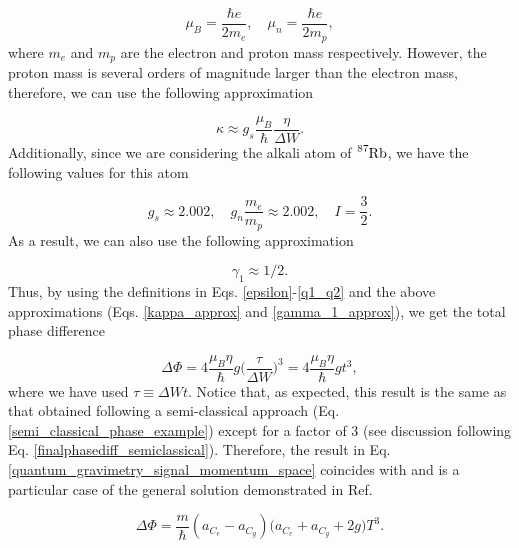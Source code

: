 \documentclass{article}
\begin{document}
\begin{equation}
\mu_{B} = \frac{\hbar e}{2 m_{e}} \mathrm{,}\quad \mu_{n} = \frac{\hbar e}{2 m_{p}},
\end{equation}
%
where $m_{e}$ and $m_{p}$ are the electron and proton mass respectively. However, the proton mass is several orders of magnitude larger than the electron mass, therefore, we can use the following approximation

\begin{equation}\label{kappa_approx}
\kappa \approx g_{s}\frac{\mu_{B}}{\hbar} \frac{\eta}{\Delta W}.
\end{equation}
%
Additionally, since we are considering the alkali atom of $\ce{^{87}_{}Rb}$, we have the following values for this atom \cite{KAUSHALSK1970, Bunge1993} 

\begin{equation}
g_{s} \approx 2.002 \mathrm{,}\quad g_{n} \frac{m_{e}}{m_{p}} \approx 2.002 \mathrm{,}\quad I = \frac{3}{2}.
\end{equation}
%
As a result, we can also use the following approximation

\begin{equation}\label{gamma_1_approx}
\gamma_{1} \approx 1/2.
\end{equation}
%
Thus, by using the definitions in Eqs. \ref{epsilon}-\ref{q1_q2} and the above approximations (Eqs. \ref{kappa_approx} and \ref{gamma_1_approx}), we get the total phase difference

\begin{equation}\label{quantum_gravimetry_signal_momentum_space}
\Delta \Phi = 4 \frac{\mu_{B} \eta }{\hbar} g \bigg(\frac{\tau}{\Delta W}\bigg)^{3} = 4 \frac{\mu_{B} \eta }{\hbar} g t^{3},
\end{equation}
%
where we have used $\tau\equiv \Delta W t$. Notice that, as expected, this result is the same as that obtained following a semi-classical approach (Eq. \ref{semi_classical_phase_example}) except for a factor of $3$ (see discussion following Eq. \ref{finalphasediff_semiclassical}). Therefore, the result in Eq. \ref{quantum_gravimetry_signal_momentum_space} coincides with and is a particular case of the general solution demonstrated in Ref. \cite{Zimmermann2017}

\begin{equation}\label{finalphasediff_quantum}
    \Delta \Phi= \frac{m}{\hbar} (a_{C_{e}} - a_{C_{g}}) \big( a_{C_{e}} + a_{C_{g}} + 2 g \big) T^{3}.
\end{equation}
\end{document}
